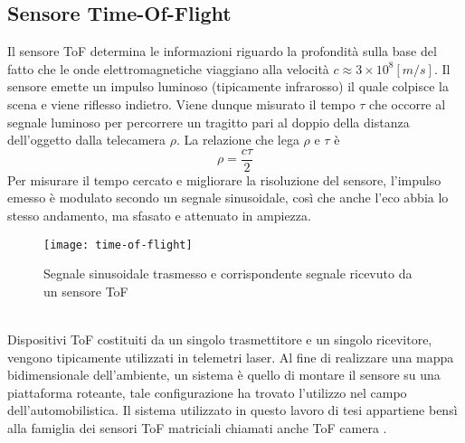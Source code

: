 \subsection{Sensore Time-Of-Flight}
Il sensore ToF determina le informazioni riguardo la profondità sulla base del fatto che le onde elettromagnetiche viaggiano alla velocità \(c\approx3\times 10^8[m/s]\). Il sensore emette un impulso luminoso (tipicamente infrarosso) il quale colpisce la scena e viene riflesso indietro. Viene dunque misurato il tempo $\tau$ che occorre al segnale luminoso per percorrere un tragitto pari al doppio della distanza dell'oggetto dalla telecamera $\rho$. La relazione che lega $\rho$ e $\tau$ è $$\rho=\frac{c\tau}{2}$$
Per misurare il tempo cercato e migliorare la risoluzione del sensore, l'impulso emesso è modulato secondo un segnale sinusoidale, così che anche l'eco abbia lo stesso andamento, ma
sfasato e attenuato in ampiezza.
\begin{figure}[ht]
    \centering
    \texttt{[image: time-of-flight]}
    \caption[Principio time-of-flight]{Segnale sinusoidale trasmesso e corrispondente segnale ricevuto da un sensore ToF \cite{rif1}}
\end{figure}\\
Dispositivi ToF costituiti da un singolo trasmettitore e un singolo ricevitore, vengono tipicamente utilizzati in telemetri laser. Al fine di realizzare una mappa bidimensionale dell'ambiente, un sistema è quello di montare il sensore su una piattaforma roteante, tale configurazione ha trovato l'utilizzo nel campo dell'automobilistica. Il sistema utilizzato in questo lavoro di tesi appartiene bensì alla famiglia dei sensori ToF matriciali chiamati anche ToF camera \cite{rif1}.

